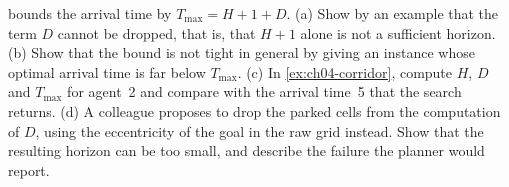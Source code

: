 \begin{exercise}[\difficulty{3}]
\label{exr:ch04-horizon}
 bounds the arrival time by $T_{\max} = H + 1 + D$.
(a) Show by an example that the term $D$ cannot be dropped, that is, that
$H + 1$ alone is not a sufficient horizon. (b) Show that the bound is not tight
in general by giving an instance whose optimal arrival time is far below
$T_{\max}$. (c) In \cref{ex:ch04-corridor}, compute $H$, $D$ and $T_{\max}$ for
agent~2 and compare with the arrival time~5 that the search returns.
(d) A colleague proposes to drop the parked cells from the computation of $D$,
using the eccentricity of the goal in the raw grid instead. Show that the
resulting horizon can be too small, and describe the failure the planner would
report.
\end{exercise}
